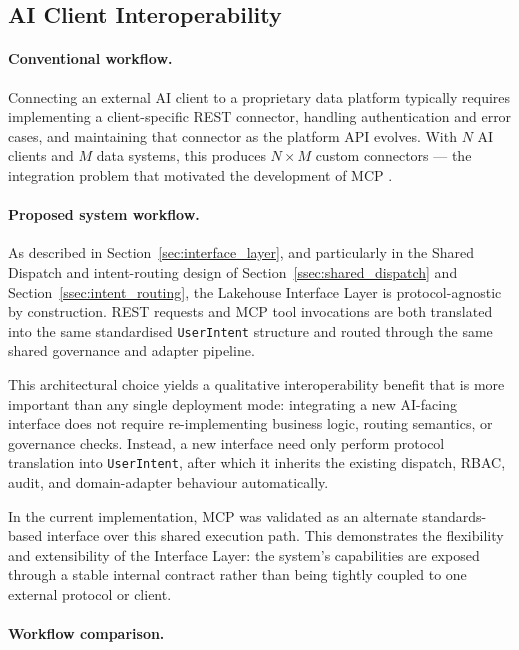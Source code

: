 \documentclass[12pt, a4paper]{report}
\begin{document}
\subsection{AI Client Interoperability}
\label{ssec:mcp_usability}

\paragraph{Conventional workflow.}
Connecting an external AI client to a proprietary data platform typically requires
implementing a client-specific REST connector, handling authentication and error cases,
and maintaining that connector as the platform API evolves. With $N$ AI clients and
$M$ data systems, this produces $N \times M$ custom connectors --- the integration
problem that motivated the development of MCP \citep{anthropic2024mcp}.

\paragraph{Proposed system workflow.}
As described in Section~\ref{sec:interface_layer}, and particularly in the Shared
Dispatch and intent-routing design of Section~\ref{ssec:shared_dispatch} and
Section~\ref{ssec:intent_routing}, the Lakehouse Interface Layer is protocol-agnostic
by construction. REST requests and MCP tool invocations are both translated into the
same standardised \texttt{UserIntent} structure and routed through the same shared
governance and adapter pipeline.

This architectural choice yields a qualitative interoperability benefit that is more
important than any single deployment mode: integrating a new AI-facing interface does
not require re-implementing business logic, routing semantics, or governance checks.
Instead, a new interface need only perform protocol translation into
\texttt{UserIntent}, after which it inherits the existing dispatch, RBAC, audit, and
domain-adapter behaviour automatically.

In the current implementation, MCP was validated as an alternate standards-based
interface over this shared execution path. This demonstrates the flexibility and
extensibility of the Interface Layer: the system's capabilities are exposed through a
stable internal contract rather than being tightly coupled to one external protocol or
client.

\paragraph{Workflow comparison.}
\end{document}
